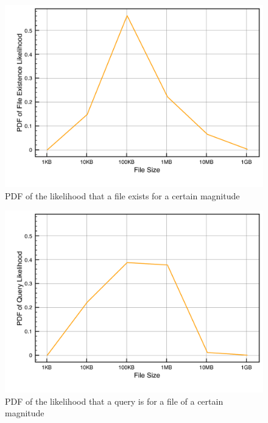 \begin{figure}
\begin{center}
\includegraphics[scale=0.5]{figures/hierarchy-data-pdf-existence.pdf}
\end{center}
\caption{PDF of the likelihood that a file exists for a certain magnitude}
\label{fig:file-pdf-exists}
\end{figure}


\begin{figure}
\begin{center}
\includegraphics[scale=0.5]{figures/hierarchy-data-pdf-requests.pdf}
\end{center}
\caption{PDF of the likelihood that a query is for a file of a certain
magnitude}
\label{fig:file-pdf-requests}
\end{figure}

